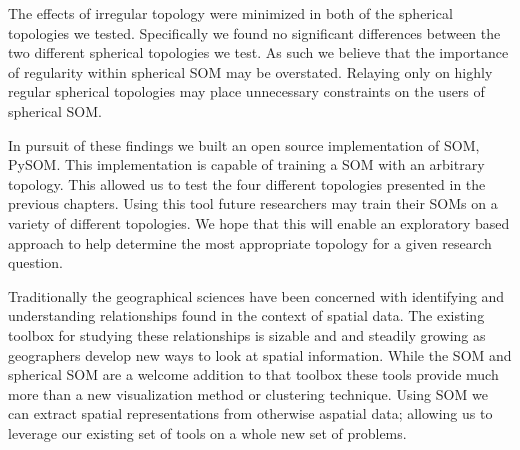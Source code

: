 The effects of irregular topology were minimized in both of the spherical
topologies we tested.  Specifically we found no significant differences
between the two different spherical topologies we test.  As such we believe
that the importance of regularity within spherical SOM may be overstated.
Relaying only on highly regular spherical topologies may place
unnecessary constraints on the users of spherical SOM.  

In pursuit of these findings we built an open source implementation of SOM,
PySOM. This implementation is capable of training a SOM with an arbitrary
topology.  This allowed us to test the four different topologies presented in
the previous chapters.  Using this tool future researchers may train their
SOMs on a variety of different topologies.  We hope that this will enable an
exploratory based approach to help determine the most appropriate topology for
a given research question.

Traditionally the geographical sciences have been concerned with identifying and
understanding relationships found in the context of spatial data.  
The existing toolbox for studying these relationships is sizable and
and steadily growing as geographers develop new ways to look at spatial
information.  While the SOM and spherical SOM are a welcome addition to that
toolbox these tools provide much more than a new visualization method or
clustering technique.  Using SOM we can extract spatial representations from
otherwise aspatial data; allowing us to leverage our existing set of
tools on a whole new set of problems.





